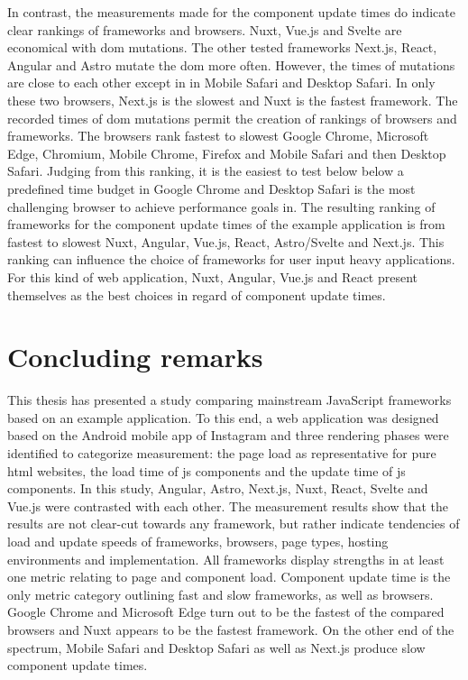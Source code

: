 \documentclass[a4paper, 12pt]{article}
\begin{document}
In contrast, the measurements made for the component update times do indicate clear rankings of frameworks and browsers.
Nuxt, Vue.js and Svelte are economical with \acrshort{dom} mutations.
The other tested frameworks Next.js, React, Angular and Astro mutate the \acrshort{dom} more often.
However, the times of mutations are close to each other except in in Mobile Safari and Desktop Safari.
In only these two browsers, Next.js is the slowest and Nuxt is the fastest framework.
The recorded times of \acrshort{dom} mutations permit the creation of rankings of browsers and frameworks.
The browsers rank fastest to slowest Google Chrome, Microsoft Edge, Chromium, Mobile Chrome, Firefox and Mobile Safari and then Desktop Safari.
Judging from this ranking, it is the easiest to test below below a predefined time budget in Google Chrome and Desktop Safari is the most challenging browser to achieve performance goals in.
The resulting ranking of frameworks for the component update times of the example application is from fastest to slowest Nuxt, Angular, Vue.js, React, Astro/Svelte and Next.js.
This ranking can influence the choice of frameworks for user input heavy applications.
For this kind of web application, Nuxt, Angular, Vue.js and React present themselves as the best choices in regard of component update times.

\section{Concluding remarks}\label{sec:conclusion}

This thesis has presented a study comparing mainstream JavaScript frameworks based on an example application.
To this end, a web application was designed based on the Android mobile app of Instagram and three rendering phases were identified to categorize measurement: the page load as representative for pure \acrshort{html} websites, the load time of \acrlong{js} components and the update time of \acrlong{js} components.
In this study, Angular, Astro, Next.js, Nuxt, React, Svelte and Vue.js were contrasted with each other.
The measurement results show that the results are not clear-cut towards any framework, but rather indicate tendencies of load and update speeds of frameworks, browsers, page types, hosting environments and implementation.
All frameworks display strengths in at least one metric relating to page and component load.
Component update time is the only metric category outlining fast and slow frameworks, as well as browsers.
Google Chrome and Microsoft Edge turn out to be the fastest of the compared browsers and Nuxt appears to be the fastest framework.
On the other end of the spectrum, Mobile Safari and Desktop Safari as well as Next.js produce slow component update times.
\end{document}
